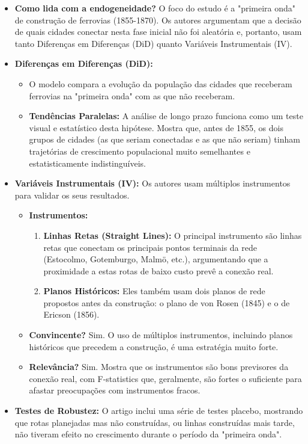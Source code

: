 \documentclass[12pt, a4paper]{article}
\begin{document}
\begin{itemize}
    \item \textbf{Como lida com a endogeneidade?} O foco do estudo é a "primeira onda" de construção de ferrovias (1855-1870). Os autores argumentam que a decisão de quais cidades conectar nesta fase inicial não foi aleatória e, portanto, usam tanto Diferenças em Diferenças (DiD) quanto Variáveis Instrumentais (IV).

    \item \textbf{Diferenças em Diferenças (DiD):}
    \begin{itemize}
        \item O modelo compara a evolução da população das cidades que receberam ferrovias na "primeira onda" com as que não receberam.
        \item \textbf{Tendências Paralelas:} A análise de longo prazo funciona como um teste visual e estatístico desta hipótese. Mostra que, antes de 1855, os dois grupos de cidades (as que seriam conectadas e as que não seriam) tinham trajetórias de crescimento populacional muito semelhantes e estatisticamente indistinguíveis.
    \end{itemize}

    \item \textbf{Variáveis Instrumentais (IV):} Os autores usam múltiplos instrumentos para validar os seus resultados.
    \begin{itemize}
        \item \textbf{Instrumentos:}
            \begin{enumerate}
                \item \textbf{Linhas Retas (Straight Lines):} O principal instrumento são linhas retas que conectam os principais pontos terminais da rede (Estocolmo, Gotemburgo, Malmö, etc.), argumentando que a proximidade a estas rotas de baixo custo prevê a conexão real.
                \item \textbf{Planos Históricos:} Eles também usam dois planos de rede propostos antes da construção: o plano de von Rosen (1845) e o de Ericson (1856).
            \end{enumerate}
        \item \textbf{Convincente?} Sim. O uso de múltiplos instrumentos, incluindo planos históricos que precedem a construção, é uma estratégia muito forte.
        \item \textbf{Relevância?} Sim. Mostra que os instrumentos são bons previsores da conexão real, com F-statistics que, geralmente, são fortes o suficiente para afastar preocupações com instrumentos fracos.
    \end{itemize}

    \item \textbf{Testes de Robustez:} O artigo inclui uma série de testes placebo, mostrando que rotas planejadas mas não construídas, ou linhas construídas mais tarde, não tiveram efeito no crescimento durante o período da "primeira onda".
\end{itemize}
\end{document}
